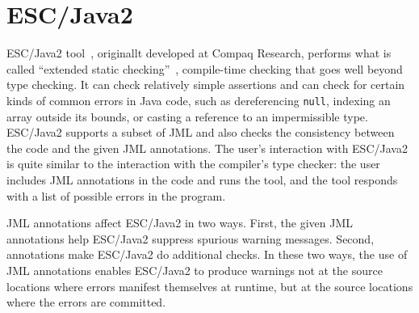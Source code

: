 

\section{ESC/Java2}
\label{escjava}

ESC/Java2 tool~\cite{Flanagan-Et-Al02}, originallt developed at Compaq Research,
performs what is called ``extended static
checking''~\cite{ESC:Overview,10yearsESC},
compile-time checking that goes well beyond type checking.  It can
check relatively simple assertions and can check for certain kinds of
common errors in Java code, such as dereferencing \texttt{null},
indexing an array outside its bounds, or casting a reference to an
impermissible type.  ESC/Java2 supports a subset of JML and also checks
the consistency between the code and the given JML annotations.  The
user's interaction with ESC/Java2 is quite similar to the interaction
with the compiler's type checker: the user includes JML annotations in
the code and runs the tool, and the tool responds with a list of
possible errors in the program.

JML annotations affect ESC/Java2 in two ways.  First, the given JML
annotations help ESC/Java2 suppress spurious warning messages.   Second,
annotations make ESC/\-Java2 do additional checks.  
In these two ways, the use of JML annotations enables ESC/Java2 to
produce warnings not at the source locations where errors manifest
themselves at runtime, but at the source locations where the errors
are committed.




